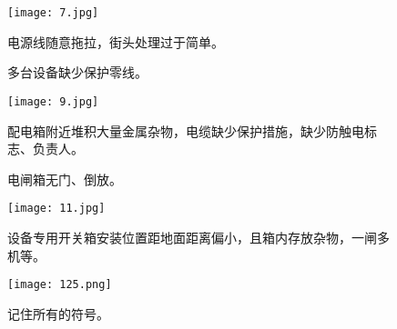 		\begin{figure}[htbp]
			\centering
			\begin{minipage}{0.45\textwidth}
				\centering
				 {\texttt{[image: 7.jpg]}}                   %
				\caption*{电源线随意拖拉，街头处理过于简单。}
			\end{minipage}     \hspace{2em}
			\begin{minipage}{0.45\textwidth}
				\centering
				\caption*{多台设备缺少保护零线。}
			\end{minipage}
		\end{figure}
		\vspace*{1cm}
				

		\begin{figure}[htbp]
			\centering
			\begin{minipage}{0.45\textwidth}
				\centering
				 {\texttt{[image: 9.jpg]}}                   %
				\caption*{配电箱附近堆积大量金属杂物，电缆缺少保护措施，缺少防触电标志、负责人。}
			\end{minipage}     \hspace{2em}
			\begin{minipage}{0.45\textwidth}
				\centering
				\caption*{电闸箱无门、倒放。}
			\end{minipage}
		\end{figure}
		\vspace*{1cm}


		\begin{figure}[htbp]
			\centering
				 {\texttt{[image: 11.jpg]}}                   %
				\caption*{设备专用开关箱安装位置距地面距离偏小，且箱内存放杂物，一闸多机等。}
		\end{figure}
		\vspace*{1cm}
		\begin{figure}[htbp]
			\centering
			\texttt{[image: 125.png]}
			\caption*{记住所有的符号。}
		\end{figure}












